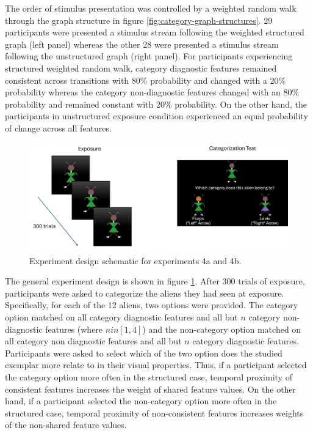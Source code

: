 The order of stimulus presentation was controlled by a weighted random walk through the graph structure in figure \ref{fig:category-graph-structures}. 29 participants were presented a stimulus stream following the weighted structured graph (left panel) whereas the other 28 were presented a stimulus stream following the unstructured graph (right panel). For participants experiencing structured weighted random walk, category diagnostic features remained consistent across transitions with 80\% probability and changed with a 20\% probability whereas the category non-diagnostic features changed with an 80\% probability and remained constant with 20\% probability. On the other hand, the participants in unstructured exposure condition experienced an equal probability of change across all features. 

\begin{figure}
    \centering
    \includegraphics[width = \textwidth]{chapter_notebooks/chapter_4/figures/exp45_design.png}
    \caption{Experiment design schematic for experiments 4a and 4b.}
    \label{fig:exp45-deisgn}
\end{figure}

The general experiment design is shown in figure \ref{fig:exp45-deisgn}. After 300 trials of exposure, participants were asked to categorize the aliens they had seen at exposure. Specifically, for each of the 12 aliens, two options were provided. The category option matched on all category diagnostic features and all but $n$ category non-diagnostic features (where $n in [1,4]$) and the non-category option matched on all category non diagnostic features and all but $n$ category diagnostic features. Participants were asked to select which of the two option does the studied exemplar more relate to in their visual properties. Thus, if a participant selected the category option more often in the structured case, temporal proximity of consistent features increases the weight of shared feature values. On the other hand, if a participant selected the non-category option more often in the structured case, temporal proximity of non-consistent features increases weights of the non-shared feature values.

